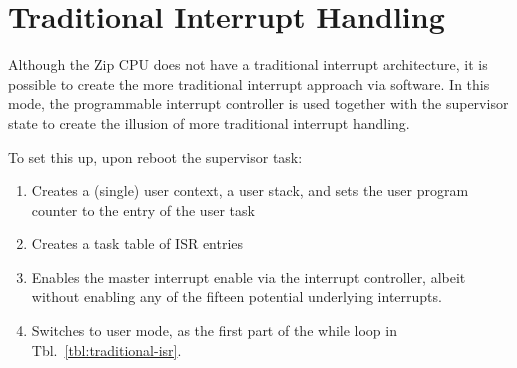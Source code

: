 \documentclass{gqtekspec}
\begin{document}
\section{Traditional Interrupt Handling}
Although the Zip CPU does not have a traditional interrupt architecture,
it is possible to create the more traditional interrupt approach via software.
In this mode, the programmable interrupt controller is used together with the
supervisor state to create the illusion of more traditional interrupt handling.

To set this up, upon reboot the supervisor task:
\begin{enumerate}
\item Creates a (single) user context, a user stack, and sets the user
	program counter to the entry of the user task
\item Creates a task table of ISR entries
\item Enables the master interrupt enable via the interrupt controller, albeit
	without enabling any of the fifteen potential underlying interrupts.
\item Switches to user mode, as the first part of the while loop in 
	Tbl.~\ref{tbl:traditional-isr}.
\end{enumerate}
\end{document}
